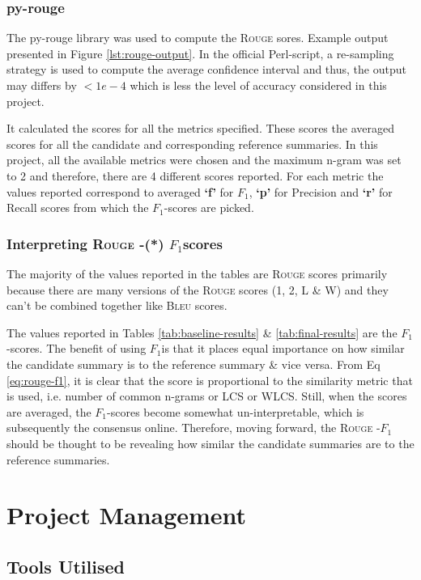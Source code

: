 \documentclass[12pt,a4paper,twoside,openright]{report}
\newcommand{\bleu}{\textsc{Bleu} }
\newcommand{\rouge}{\textsc{Rouge} }
\newcommand{\fone}{$F_1$}
\begin{document}
\subsubsection{py-rouge}
The py-rouge library was used to compute the \rouge sores. Example output presented in Figure \ref{lst:rouge-output}. In the official Perl-script, a re-sampling strategy is used to compute the average confidence interval and thus, the output may differs by $<1e−4$ which is less the level of accuracy considered in this project.

It calculated the scores for all the metrics specified. These scores the averaged scores for all the candidate and corresponding reference summaries. In this project, all the available metrics were chosen and the maximum n-gram was set to 2 and therefore, there are 4 different scores reported. For each metric the values reported correspond to averaged \textbf{`f'} for \fone, \textbf{`p'} for Precision and \textbf{`r'} for Recall scores from which the \fone-scores are picked.

\subsubsection{Interpreting {\rouge}-(*) \fone scores}
The majority of the values reported in the tables are \rouge scores primarily because there are many versions of the \rouge scores (1, 2, L \& W) and they can't be combined together like \bleu scores.

The values reported in Tables \ref{tab:baseline-results} \& \ref{tab:final-results} are the \fone-scores. The benefit of using \fone  is that it places equal importance on how similar the candidate summary is to the reference summary \& vice versa. From  Eq \ref{eq:rouge-f1}, it is clear that the score is proportional to the similarity metric that is used, i.e. number of common n-grams or LCS or WLCS. Still, when the scores are averaged, the \fone-scores become somewhat un-interpretable, which is subsequently the consensus online. Therefore, moving forward, the \rouge-\fone should be thought to be revealing how similar the candidate summaries are to the reference summaries.


\section{Project Management}
\label{project-management}

\subsection{Tools Utilised}
\label{tools-utilized}
\end{document}
